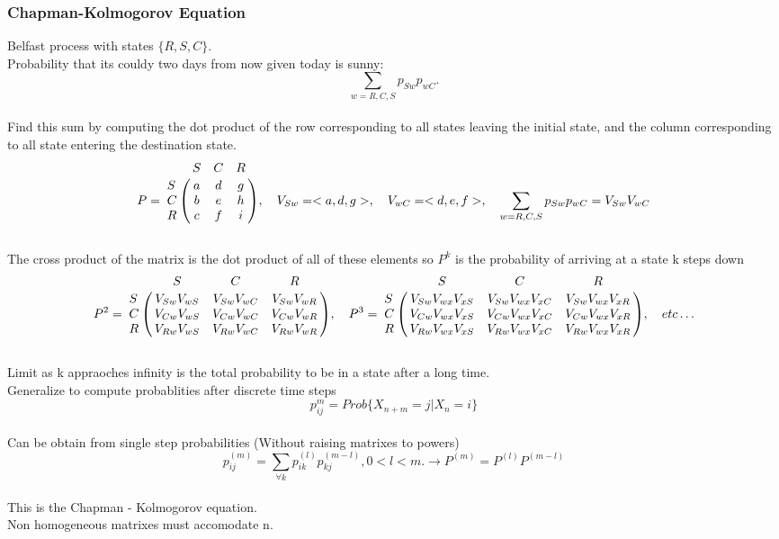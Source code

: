 \documentclass{article}
\begin{document}
	\subsubsection {Chapman-Kolmogorov Equation}
	Belfast process with states $\{R,S,C\}$. 
	\\Probability that its couldy two days from now given today is sunny: 
	\[ \sum\limits_{w=R,C,S}{p_{Sw}p_{wC}}. \]
	\\Find this sum by computing the dot product of the row corresponding to all states leaving the initial state, and the column corresponding to all state
	entering the destination state. 
	\[P = \bordermatrix{   
              & S    & C    & R    \cr
            S & a & d & g \cr
			C & b & e & h \cr
			R & c & f & i } 
			, \quad V_{Sw} = <a,d,g>
			, \quad V_{wC} = <d,e,f>
			, \quad \sum\limits_{w=R,C,S}{p_{Sw}p_{wC}} = V_{Sw}V_{wC}
    \]
	\\The cross product of the matrix is the dot product of all of these elements so $P^k$ is the probability of arriving at a state k steps down
	\[P^2= \bordermatrix{   
              & S    & C    & R    \cr
            S & V_{Sw}V_{wS} & V_{Sw}V_{wC} & V_{Sw}V_{wR} \cr
			C & V_{Cw}V_{wS} & V_{Cw}V_{wC} & V_{Cw}V_{wR} \cr
			R & V_{Rw}V_{wS} & V_{Rw}V_{wC} & V_{Rw}V_{wR} }  
	 ,\quad P^3= \bordermatrix{   
              & S    & C    & R    \cr
            S & V_{Sw}V_{wx}V_{xS} & V_{Sw}V_{wx}V_{xC} & V_{Sw}V_{wx}V_{xR} \cr
			C & V_{Cw}V_{wx}V_{xS} & V_{Cw}V_{wx}V_{xC} & V_{Cw}V_{wx}V_{xR} \cr
			R & V_{Rw}V_{wx}V_{xS} & V_{Rw}V_{wx}V_{xC} & V_{Rw}V_{wx}V_{xR} }  
	,\quad etc\ldots \]
	\\Limit as k appraoches infinity is the total probability to be in a state after a long time.  
	\\Generalize to compute probablities after discrete time steps 
	\[ p_{ij}^{m} = Prob\{ X_{n+m} = j | X_{n} = i \} \]
	\\Can be obtain from single step probabilities (Without raising matrixes to powers)
	\[ p_{ij}^{(m)} = \sum\limits_{\forall k}{p_{ik}^{(l)}p_{kj}^{(m-l)}}, 0 < l < m. \rightarrow P^{(m)} = P^{(l)}P^{(m-l)}\]
	\\This is the Chapman - Kolmogorov equation.
	\\Non homogeneous matrixes must accomodate n. 
\end{document}
